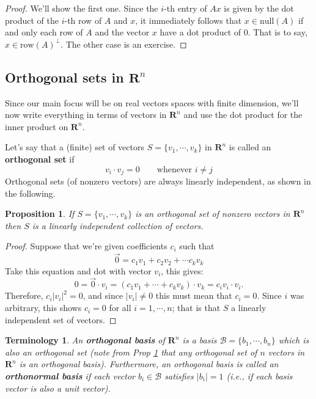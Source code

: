\documentclass[12pt]{article}
\numberwithin{equation}{subsection}
\numberwithin{figure}{subsection}
\newtheorem{prop}[subsection]{Proposition}
\theoremstyle{note}
\newtheorem{terminology}[subsection]{Terminology}
\newcommand{\R}{\mathbf{R}}
\newcommand\nul[1]{\mathrm{null}(#1)}
\newcommand\row[1]{\mathrm{row}(#1)}
\begin{document}
\begin{proof}
We'll show the first one. Since the $i$-th entry of $Ax$ is given by the dot product of the $i$-th row of $A$ and $x$, it immediately follows that $x\in \nul{A}$ if and only each row of $A$ and the vector $x$ have a dot product of $0$. That is to say, $x\in \row{A}^{\perp}.$ The other case is an exercise.
\end{proof}


\subsection{Orthogonal sets in $\R^n$}
Since our main focus will be on real vectors spaces with finite dimension, we'll now write everything in terms of vectors in $\R^n$ and use the dot product for the inner product on $\R^n$. %

Let's say that a (finite) set of vectors $S=\{v_1,\cdots,v_k\}$ in $\R^n$ is called an \textbf{orthogonal set} if \begin{equation} v_i\cdot v_j=0 \qquad \text{whenever $i\neq j$}\end{equation} Orthogonal sets (of nonzero vectors) are always linearly independent, as shown in the following.

 \begin{prop} \label{prop-orth-li}
	If $S=\{v_1,\cdots,v_k\}$ is an orthogonal set of nonzero vectors in $\R^n$ then $S$ is a linearly independent collection of vectors. 
\end{prop}
\begin{proof}
	Suppose that we're given coefficients $c_i$ such that \[ \vec{0}=c_1v_1+c_2v_2+\cdots c_kv_k\] Take this equation and dot with vector $v_i$, this gives: \[ 0 =\vec{0}\cdot v_i = (c_1 v_1+\cdots +c_k v_k)\cdot v_k= c_i v_i\cdot v_i.\] Therefore, $c_i |v_i|^2=0$, and since $|v_i|\neq0$ this must mean that $c_i=0$. Since $i$ was arbitrary, this shows $c_i=0$ for all $i=1,\cdots,n$; that is that $S$ a linearly independent set of vectors.
\end{proof}
 
\begin{terminology} An \textbf{orthogonal basis} of $\R^n$ is a basis $\mathcal{B}=\{ b_1,\cdots , b_n\}$ which is also an orthogonal set (note from Prop \ref{prop-orth-li} that any orthogonal set of $n$ vectors in $\R^n$ is an orthogonal basis). Furthermore, an orthogonal basis is called an \textbf{orthonormal basis} if each vector $b_i\in \mathcal{B}$ satisfies $|b_i|=1$ (i.e., if each basis vector is also a unit vector).
\end{terminology}
\end{document}
